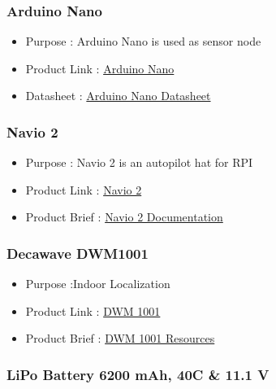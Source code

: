 \documentclass[a4paper,12pt,oneside]{book}
\begin{document}
 \subsubsection{Arduino Nano } 

\begin{itemize}
  \item Purpose : Arduino Nano is used as sensor node
  \item Product Link : \href{https://robu.in/product/arduino-nano-v3-0-ch340-chip-mini-usb-cable/?gclid=CjwKCAjw4PHZBRA-EiwAAas4ZnkY1Uyx1regBeSCiAQphWNPrAL1DfNjwFlLTFBN2IuJMkXe9YMaixoCQcsQAvD_BwE}{Arduino Nano} 
  \item Datasheet : \href{https://www.arduino.cc/en/uploads/Main/ArduinoNanoManual23.pdf}{Arduino Nano Datasheet} 
 \end{itemize}

 \subsubsection{Navio 2 } 

\begin{itemize}
  \item Purpose : Navio 2 is an autopilot hat for RPI
  \item Product Link : \href{https://store.emlid.com/product/navio2/}{Navio 2} 
  \item Product Brief : \href{https://docs.emlid.com/navio2/}{Navio 2 Documentation} 
 \end{itemize}
 
 \subsubsection{Decawave DWM1001 } 

\begin{itemize}
  \item Purpose :Indoor Localization
  \item Product Link : \href{https://www.findchips.com/search/DWM1001?gclid=CjwKCAjw4PHZBRA-EiwAAas4ZtTtjHXX9dnmI99yqhUIe2f_LFBmznETxFEPqzojVR2hLfT5Xpz6JRoCmh8QAvD_BwE&gclsrc=aw.ds}{DWM 1001} 
  \item Product Brief : \href{https://www.decawave.com/products/dwm1001-module}{DWM 1001 Resources} 
 \end{itemize}
 
 \subsubsection{LiPo Battery 6200 mAh, 40C \& 11.1 V } 
\end{document}
